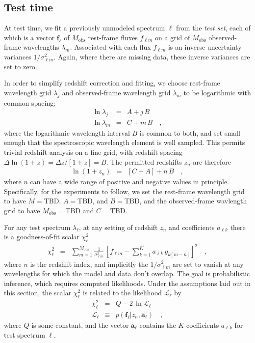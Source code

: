 \documentclass[preprint]{aastex}
\newcommand{\mmatrix}[1]{\boldsymbol{#1}}
\newcommand{\avec}{\mmatrix{a}}
\newcommand{\fvec}{\mmatrix{f}}
\newcommand{\obs}{\mathrm{obs}}
\newcommand{\like}{\mathscr{L}}
\begin{document}
\subsection{Test time}

At test time, we fit a previously unmodeled spectrum $\ell$ from the
\emph{test set}, each of which is a vector $\fvec_\ell$ of $M_\obs$
rest-frame fluxes $f_{\ell m}$ on a grid of $M_\obs$ observed-frame
wavelengths $\lambda_m$.  Associated with each flux $f_{\ell m}$ is an
inverse uncertainty variances $1/\sigma^2_{\ell m}$.  Again, where
there are missing data, these inverse variances are set to zero.

In order to simplify redshift correction and fitting, we choose
rest-frame wavelength grid $\lambda_j$ and observed-frame wavelength
grid $\lambda_m$ to be logarithmic with common spacing:
\begin{eqnarray}\displaystyle
\ln\lambda_j &=& A + j\,B \nonumber\\
\ln\lambda_m &=& C + m\,B
\quad ,
\end{eqnarray}
where the logarithmic wavelength interval $B$ is common to both, and
set small enough that the spectroscopic wavelength element is well
sampled.  This permits trivial redshift analysis on a fine grid, with
redshift spacing $\Delta\ln(1+z)=\Delta z/[1+z]=B$.  The permitted
redshifts $z_n$ are therefore
\begin{eqnarray}\displaystyle
\ln(1+z_n) &=& [C - A] + n\,B
\quad ,
\end{eqnarray}
where $n$ can have a wide range of positive and negative values in
principle.  Specifically, for the experiments to follow, we set the
rest-frame wavelength grid to have $M=$TBD, $A=$TBD, and $B=$TBD, and
the observed-frame wavlength grid to have $M_\obs=$TBD and $C=$TBD.

For any test spectrum $\lambda_\ell$, at any setting of redshift $z_n$
and coefficients $a_{\ell k}$ there is a goodness-of-fit scalar
$\chi^2_\ell$
\begin{eqnarray}\displaystyle
\chi^2_\ell &=& \sum_{m=1}^{M_\obs} \frac{1}{\sigma^2_{\ell m}}
 \,\left[f_{\ell m} - \sum_{k=1}^K a_{\ell k}\,g_{k[m-n]}\right]^2
\quad,
\end{eqnarray}
where $n$ is the redshift index, and implicitly the $1/\sigma^2_{\ell
  m}$ are set to vanish at any wavelengths for which the model and
data don't overlap.  The goal is probabilistic inference, which
requires computed likelihoods.  Under the assumptions laid out in this
section, the scalar $\chi^2_\ell$ is related to the likelihood
$\like_\ell$ by
\begin{eqnarray}\displaystyle
\chi^2_\ell &=& Q - 2\,\ln\like_\ell \nonumber\\
\like_\ell &\equiv& p(\fvec_\ell|z_n,\avec_\ell)
\quad ,
\end{eqnarray}
where $Q$ is some constant, and the vector $\avec_\ell$ contains the
$K$ coefficients $a_{\ell k}$ for test spectrum $\ell$.
\end{document}
